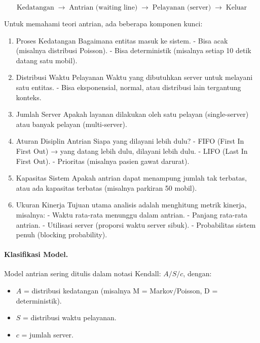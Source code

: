 \documentclass{bukumjh}
\begin{document}
\[
\text{Kedatangan} \;\longrightarrow\; \text{Antrian (waiting line)} \;\longrightarrow\; \text{Pelayanan (server)} \;\longrightarrow\; \text{Keluar}
\]

Untuk memahami teori antrian, ada beberapa komponen kunci:

\begin{enumerate}
    \item {\jsg Proses Kedatangan}  
    Bagaimana entitas masuk ke sistem.  
    - Bisa acak (misalnya distribusi Poisson).  
    - Bisa deterministik (misalnya setiap 10 detik datang satu mobil).
    
    \item {\jsg Distribusi Waktu Pelayanan}  
    Waktu yang dibutuhkan server untuk melayani satu entitas.  
    - Bisa eksponensial, normal, atau distribusi lain tergantung konteks.  
    
    \item {\jsg Jumlah Server}  
    Apakah layanan dilakukan oleh satu pelayan (single-server) atau banyak pelayan (multi-server).  
    
    \item {\jsg Aturan Disiplin Antrian}  
    Siapa yang dilayani lebih dulu?  
    - FIFO (First In First Out) → yang datang lebih dulu, dilayani lebih dulu.  
    - LIFO (Last In First Out).  
    - Prioritas (misalnya pasien gawat darurat).  
    
    \item {\jsg Kapasitas Sistem}  
    Apakah antrian dapat menampung jumlah tak terbatas, atau ada kapasitas terbatas (misalnya parkiran 50 mobil).  
    
    \item {\jsg Ukuran Kinerja}  
    Tujuan utama analisis adalah menghitung metrik kinerja, misalnya:  
    - Waktu rata-rata menunggu dalam antrian.  
    - Panjang rata-rata antrian.  
    - Utilisasi server (proporsi waktu server sibuk).  
    - Probabilitas sistem penuh (blocking probability).  
\end{enumerate}

\paragraph{Klasifikasi Model.}  
Model antrian sering ditulis dalam notasi Kendall: {\jsg $A/S/c$}, dengan:
\begin{itemize}
    \item $A$ = distribusi kedatangan (misalnya M = Markov/Poisson, D = deterministik).  
    \item $S$ = distribusi waktu pelayanan.  
    \item $c$ = jumlah server.  
\end{itemize}
\end{document}
